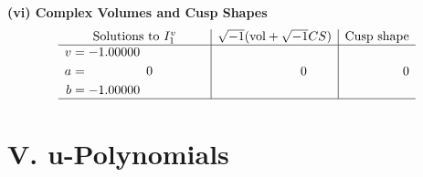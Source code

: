 \documentclass[1p]{elsarticle_modified}
\theoremstyle{definition}
\newcommand{\I}{\sqrt{-1}}
\begin{document}
\newpage\flushleft \textbf{(vi) Complex Volumes and Cusp Shapes}
$$\begin{array}{c|c|c}  
\text{Solutions to }I^v_{1}& \I (\text{vol} + \sqrt{-1}CS) & \text{Cusp shape}\\
 \hline 
\begin{aligned}
v &= -1.00000\phantom{ +0.000000I} \\
a &= \phantom{-0.000000 } 0 \\
b &= -1.00000\phantom{ +0.000000I}\end{aligned}
 & \phantom{-0.000000 } 0 & \phantom{-0.000000 } 0\\
 \hline 
 \end{array}$$\newpage
\newpage\renewcommand{\arraystretch}{1}
\centering \section*{ V. u-Polynomials}
\end{document}

